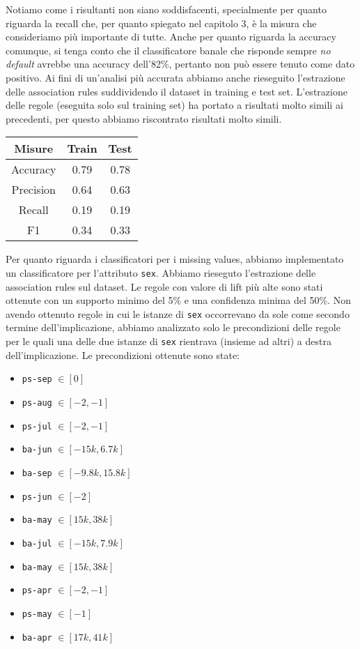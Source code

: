 Notiamo come i risultanti non siano soddisfacenti, specialmente per quanto riguarda
la recall che, per quanto spiegato nel capitolo 3, \`e la misura che consideriamo
pi\`u importante di tutte. Anche per quanto riguarda la accuracy comunque, si tenga
conto che il classificatore banale che risponde sempre \textit{no default} avrebbe
una accuracy dell'82\%, pertanto non pu\`o essere tenuto come dato positivo.
Ai fini di un'analisi pi\`u accurata abbiamo anche rieseguito l'estrazione
delle association rules suddividendo il dataset in training e test set.
L'estrazione delle regole (eseguita solo sul training set) ha portato a risultati
molto simili ai precedenti, per questo abbiamo riscontrato risultati molto simili.

\begin{center}
	\begin{tabular}{c|c|c}
		\hline
		\textbf{Misure} & \textbf{Train} & \textbf{Test}\\
		\hline
		Accuracy & 0.79 & 0.78\\
		\hline
		Precision & 0.64 & 0.63\\
		\hline
		Recall & 0.19 & 0.19\\
		\hline
		F1 & 0.34 & 0.33\\
		\hline
	\end{tabular}
\end{center}

Per quanto riguarda i classificatori per i missing values, abbiamo implementato
un classificatore per l'attributo \texttt{sex}. Abbiamo rieseguto l'estrazione
delle association rules sul dataset. Le regole con valore di lift pi\`u
alte sono stati ottenute con un supporto minimo del 5\% e una confidenza minima del 50\%.
Non avendo ottenuto regole in cui le istanze di \texttt{sex} occorrevano
da sole come secondo termine dell'implicazione, abbiamo analizzato solo le
precondizioni delle regole per le quali una delle due istanze di \texttt{sex}
rientrava (insieme ad altri) a destra dell'implicazione.
Le precondizioni ottenute sono state:

\begin{itemize}
	\item \texttt{ps-sep} $\in [0]$
	\item \texttt{ps-aug} $\in [-2, -1]$
	\item \texttt{ps-jul} $\in [-2, -1]$
	\item \texttt{ba-jun} $\in [-15k, 6.7k]$
	\item \texttt{ba-sep} $\in [-9.8k, 15.8k]$
	\item \texttt{ps-jun} $\in [-2]$
	\item \texttt{ba-may} $\in [15k, 38k]$
	\item \texttt{ba-jul} $\in [-15k, 7.9k]$
	\item \texttt{ba-may} $\in [15k, 38k]$
	\item \texttt{ps-apr} $\in [-2, -1]$
	\item \texttt{ps-may} $\in [-1]$
	\item \texttt{ba-apr} $\in [17k, 41k]$
\end{itemize}

